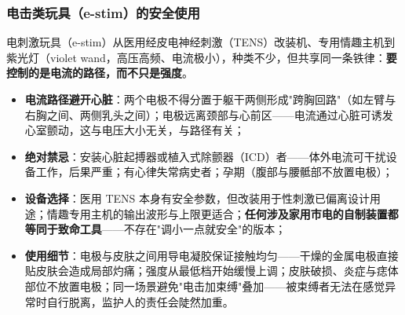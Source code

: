 \subsubsection{电击类玩具（e-stim）的安全使用}

电刺激玩具（e-stim）从医用经皮电神经刺激（TENS）改装机、专用情趣主机到紫光灯（violet wand，高压高频、电流极小），种类不少，但共享同一条铁律：\textbf{要控制的是电流的路径，而不只是强度}。

\begin{itemize}
\item \textbf{电流路径避开心脏}：两个电极不得分置于躯干两侧形成"跨胸回路"（如左臂与右胸之间、两侧乳头之间）；电极远离颈部与心前区——电流通过心脏可诱发心室颤动，这与电压大小无关，与路径有关；
\item \textbf{绝对禁忌}：安装心脏起搏器或植入式除颤器（ICD）者——体外电流可干扰设备工作，后果严重；有心律失常病史者；孕期（腹部与腰骶部不放置电极）；
\item \textbf{设备选择}：医用 TENS 本身有安全参数，但改装用于性刺激已偏离设计用途；情趣专用主机的输出波形与上限更适合；\textbf{任何涉及家用市电的自制装置都等同于致命工具}——不存在"调小一点就安全"的版本；
\item \textbf{使用细节}：电极与皮肤之间用导电凝胶保证接触均匀——干燥的金属电极直接贴皮肤会造成局部灼痛；强度从最低档开始缓慢上调；皮肤破损、炎症与痣体部位不放置电极；同一场景避免"电击加束缚"叠加——被束缚者无法在感觉异常时自行脱离，监护人的责任会陡然加重。
\end{itemize}

